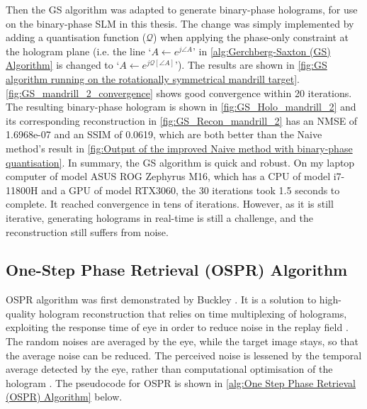 Then the GS algorithm was adapted to generate binary-phase holograms, for use on the binary-phase SLM in this thesis. The change was simply implemented by adding a quantisation function ($\mathcal{Q}$) when applying the phase-only constraint at the hologram plane (i.e. the line `$A \gets e^{j\angle A}$' in \cref{alg:Gerchberg-Saxton (GS) Algorithm} is changed to `$A \gets e^{j\mathcal{Q}[\angle A]}$'). The results are shown in \cref{fig:GS algorithm running on the rotationally symmetrical mandrill target}. \cref{fig:GS_mandrill_2_convergence} shows good convergence within 20 iterations. The resulting binary-phase hologram is shown in \cref{fig:GS_Holo_mandrill_2} and its corresponding reconstruction in \cref{fig:GS_Recon_mandrill_2} has an NMSE of 1.6968e-07 and an SSIM of 0.0619, which are both better than the Naive method's result in \cref{fig:Output of the improved Naive method with binary-phase quantisation}. In summary, the GS algorithm is quick and robust. On my laptop computer of model ASUS ROG Zephyrus M16, which has a CPU of model i7-11800H and a GPU of model RTX3060, the 30 iterations took 1.5 seconds to complete. It reached convergence in tens of iterations. However, as it is still iterative, generating holograms in real-time is still a challenge, and the reconstruction still suffers from noise.


\subsection{One-Step Phase Retrieval (OSPR) Algorithm}\label{sec:One Step Phase Retrieval (OSPR) Algorithm}
OSPR algorithm was first demonstrated by Buckley \cite{Buckley2006}. It is a solution to high-quality hologram reconstruction that relies on time multiplexing of holograms, exploiting the response time of eye in order to reduce noise in the replay field \cite{Cable2006}. The random noises are averaged by the eye, while the target image stays, so that the average noise can be reduced. The perceived noise is lessened by the temporal average detected by the eye, rather than computational optimisation of the hologram \cite{Cable2006}. The pseudocode for OSPR is shown in \cref{alg:One Step Phase Retrieval (OSPR) Algorithm} below.

